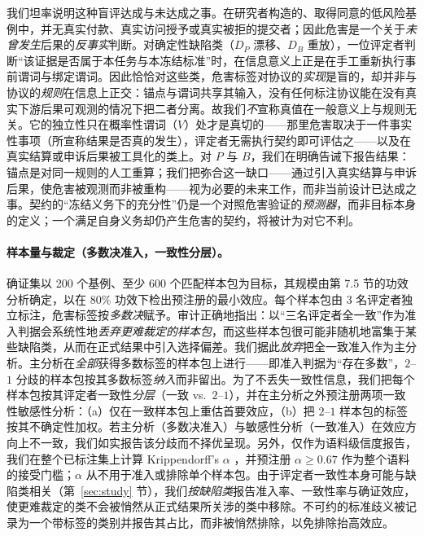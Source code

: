 \documentclass[11pt]{ctexart}
\begin{document}
我们坦率说明这种盲评达成与未达成之事。在研究者构造的、取得同意的低风险基例中，并无真实付款、真实访问授予或真实被拒的提交者；因此危害是一个关于\emph{未曾发生}后果的\emph{反事实}判断。对确定性缺陷类（$D_P$ 漂移、$D_B$ 重放），一位评定者判断“该证据是否属于本任务与本冻结标准”时，在信息意义上正是在手工重新执行事前谓词与绑定谓词。因此恰恰对这些类，危害标签对协议的\emph{实现}是盲的，却并非与协议的\emph{规则}在信息上正交：锚点与谓词共享其输入，没有任何标注协议能在没有真实下游后果可观测的情况下把二者分离。故我们\emph{不}宣称真值在一般意义上与规则无关。它的独立性只在概率性谓词（$V$）处才是真切的——那里危害取决于一件事实性事项（所宣称结果是否真的发生），评定者无需执行契约即可评估之——以及在真实结算或申诉后果被工具化的类上。对 $P$ 与 $B$，我们在明确告诫下报告结果：锚点是对同一规则的人工重算；我们把弥合这一缺口——通过引入真实结算与申诉后果，使危害被观测而非被重构——视为必要的未来工作，而非当前设计已达成之事。契约的“冻结义务下的充分性”仍是一个对照危害验证的\emph{预测器}，而非目标本身的定义；一个满足自身义务却仍产生危害的契约，将被计为对它不利。

\paragraph{样本量与裁定（多数决准入，一致性分层）。} 确证集以 200 个基例、至少 600 个匹配样本包为目标，其规模由第 7.5 节的功效分析确定，以在 80\% 功效下检出预注册的最小效应。每个样本包由 3 名评定者独立标注，危害标签按\emph{多数决}赋予。审计正确地指出：以“三名评定者全一致”作为准入判据会系统性地\emph{丢弃更难裁定的样本包}，而这些样本包很可能非随机地富集于某些缺陷类，从而在正式结果中引入选择偏差。我们据此\emph{放弃}把全一致准入作为主分析。主分析在\emph{全部}获得多数标签的样本包上进行——即准入判据为“存在多数”，$2$--$1$ 分歧的样本包按其多数标签\emph{纳入}而非留出。为了不丢失一致性信息，我们把每个样本包按其评定者一致性\emph{分层}（一致 vs.\ $2$--$1$），并在主分析之外预注册两项一致性敏感性分析：（a）仅在一致样本包上重估首要效应，（b）把 $2$--$1$ 样本包的标签按其不确定性加权。若主分析（多数决准入）与敏感性分析（一致准入）在效应方向上不一致，我们如实报告该分歧而不择优呈现。另外，仅作为语料级信度报告，我们在整个已标注集上计算 Krippendorff's $\alpha$ \cite{hayes2007answering}，并预注册 $\alpha\geq 0.67$ 作为整个语料的接受门槛；$\alpha$ 从不用于准入或排除单个样本包。由于评定者一致性本身可能与缺陷类相关（第~\ref{sec:study} 节），我们\emph{按缺陷类}报告准入率、一致性率与确证效应，使更难裁定的类不会被悄然从正式结果所关涉的类中移除。不可约的标准歧义被记录为一个带标签的类别并报告其占比，而非被悄然排除，以免排除抬高效应。
\end{document}
